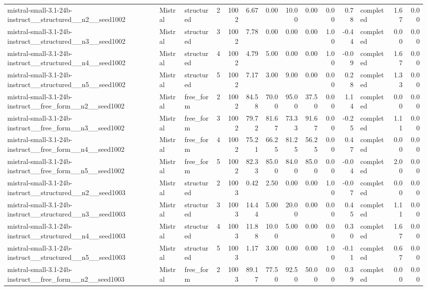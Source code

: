 \begin{longtable}{lllrrrrrrrrlrr}
mistral-small-3.1-24b-instruct\_\_structured\_\_n2\_\_seed1002 & Mistral & structured & 2 & 1002 & 6.67 & 0.00 & 10.00 & 0.00 & 0.00 & 0.78 & completed & 1.67 & 0.00 \\
mistral-small-3.1-24b-instruct\_\_structured\_\_n3\_\_seed1002 & Mistral & structured & 3 & 1002 & 7.78 & 0.00 & 0.00 & 0.00 & 1.00 & -0.44 & completed & 0.00 & 0.00 \\
mistral-small-3.1-24b-instruct\_\_structured\_\_n4\_\_seed1002 & Mistral & structured & 4 & 1002 & 4.79 & 5.00 & 0.00 & 0.00 & 1.00 & -0.09 & completed & 1.67 & 0.00 \\
mistral-small-3.1-24b-instruct\_\_structured\_\_n5\_\_seed1002 & Mistral & structured & 5 & 1002 & 7.17 & 3.00 & 9.00 & 0.00 & 0.00 & 0.28 & completed & 1.33 & 0.00 \\
mistral-small-3.1-24b-instruct\_\_free\_form\_\_n2\_\_seed1002 & Mistral & free\_form & 2 & 1002 & 84.58 & 70.00 & 95.00 & 37.50 & 0.00 & 1.14 & completed & 0.00 & 0.00 \\
mistral-small-3.1-24b-instruct\_\_free\_form\_\_n3\_\_seed1002 & Mistral & free\_form & 3 & 1002 & 79.72 & 81.67 & 73.33 & 91.67 & 0.00 & -0.25 & completed & 1.11 & 0.00 \\
mistral-small-3.1-24b-instruct\_\_free\_form\_\_n4\_\_seed1002 & Mistral & free\_form & 4 & 1002 & 75.21 & 66.25 & 81.25 & 56.25 & 0.00 & 0.47 & completed & 0.00 & 0.00 \\
mistral-small-3.1-24b-instruct\_\_free\_form\_\_n5\_\_seed1002 & Mistral & free\_form & 5 & 1002 & 82.33 & 85.00 & 84.00 & 85.00 & 0.00 & -0.04 & completed & 2.00 & 0.00 \\
mistral-small-3.1-24b-instruct\_\_structured\_\_n2\_\_seed1003 & Mistral & structured & 2 & 1003 & 0.42 & 2.50 & 0.00 & 0.00 & 1.00 & -0.07 & completed & 0.00 & 0.00 \\
mistral-small-3.1-24b-instruct\_\_structured\_\_n3\_\_seed1003 & Mistral & structured & 3 & 1003 & 14.44 & 5.00 & 20.00 & 0.00 & 0.00 & 0.45 & completed & 1.11 & 0.00 \\
mistral-small-3.1-24b-instruct\_\_structured\_\_n4\_\_seed1003 & Mistral & structured & 4 & 1003 & 11.88 & 10.00 & 5.00 & 0.00 & 0.00 & 0.30 & completed & 1.67 & 0.00 \\
mistral-small-3.1-24b-instruct\_\_structured\_\_n5\_\_seed1003 & Mistral & structured & 5 & 1003 & 1.17 & 3.00 & 0.00 & 0.00 & 1.00 & -0.11 & completed & 0.67 & 0.00 \\
mistral-small-3.1-24b-instruct\_\_free\_form\_\_n2\_\_seed1003 & Mistral & free\_form & 2 & 1003 & 89.17 & 77.50 & 92.50 & 50.00 & 0.00 & 0.39 & completed & 0.00 & 0.00 \\

\end{longtable}
